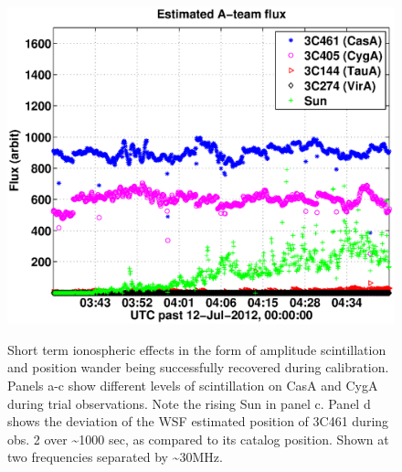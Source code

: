 \documentclass{aa}
\begin{document}
\begin{figure}[tbh]
{\includegraphics[width=\columnwidth]{Figs/combined_SB002_2_convcalsol_bin_sigmas.eps}}

\caption{\label{fig:Estimated-flux-of}Short term ionospheric effects in the form
  of amplitude  scintillation and  position wander being  successfully recovered
  during calibration. Panels a-c show  different levels of scintillation on CasA
  and CygA  during trial observations. Note the  rising Sun in panel  c. Panel d
  shows the deviation of the WSF  estimated position of 3C461 during obs. 2 over
  \textasciitilde{}1000 sec, as  compared to its catalog position.  Shown at two
  frequencies separated by \textasciitilde{}30MHz.}
\end{figure}
\end{document}
